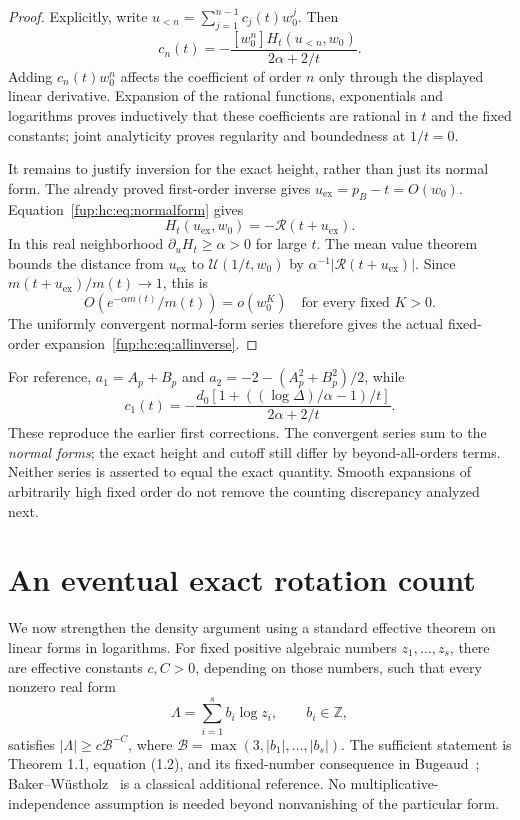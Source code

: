 \documentclass[11pt,letterpaper]{article}
\theoremstyle{definition}\newtheorem{definition}[theorem]{Definition}
\theoremstyle{remark}\newtheorem{remark}[theorem]{Remark}
\newcommand{\Z}{\mathbb Z}\newcommand{\Np}{\mathbb Z_{>0}}
\begin{document}
\begin{proof}
Explicitly, write $u_{<n}=\sum_{j=1}^{n-1}c_j(t)w_0^j$. Then
\begin{equation}\label{fup:hc:eq:inverserec}
 c_n(t)=-\frac{[w_0^n]H_t(u_{<n},w_0)}{2\alpha+2/t}.
\end{equation}
Adding $c_n(t)w_0^n$ affects the coefficient of order $n$ only through the displayed linear derivative. Expansion of the rational functions, exponentials and logarithms proves inductively that these coefficients are rational in $t$ and the fixed constants; joint analyticity proves regularity and boundedness at $1/t=0$.

It remains to justify inversion for the exact height, rather than just its normal form. The already proved first-order inverse gives $u_{\mathrm{ex}}=p_B-t=O(w_0)$. Equation~\eqref{fup:hc:eq:normalform} gives
\[
 H_t(u_{\mathrm{ex}},w_0)=-\mathcal R(t+u_{\mathrm{ex}}).
\]
In this real neighborhood $\partial_uH_t\ge\alpha>0$ for large $t$. The mean value theorem bounds the distance from $u_{\mathrm{ex}}$ to $\mathcal U(1/t,w_0)$ by $\alpha^{-1}|\mathcal R(t+u_{\mathrm{ex}})|$. Since $m(t+u_{\mathrm{ex}})/m(t)\to1$, this is
\[
 O(e^{-\alpha m(t)}/m(t))=o(w_0^K)\quad\text{for every fixed }K>0.
\]
The uniformly convergent normal-form series therefore gives the actual fixed-order expansion~\eqref{fup:hc:eq:allinverse}.
\end{proof}

For reference, $a_1=A_p+B_p$ and $a_2=-2-(A_p^2+B_p^2)/2$, while
\[
 c_1(t)=-\frac{d_0[1+((\log\Delta)/\alpha-1)/t]}{2\alpha+2/t}.
\]
These reproduce the earlier first corrections. The convergent series sum to the \emph{normal forms}; the exact height and cutoff still differ by beyond-all-orders terms. Neither series is asserted to equal the exact quantity. Smooth expansions of arbitrarily high fixed order do not remove the counting discrepancy analyzed next.


\section{An eventual exact rotation count}\label{fup:hc:sec:exact}
We now strengthen the density argument using a standard effective theorem on linear forms in logarithms. For fixed positive algebraic numbers $z_1,\ldots,z_s$, there are effective constants $c,C>0$, depending on those numbers, such that every nonzero real form
\[
 \Lambda=\sum_{i=1}^s b_i\log z_i,\qquad b_i\in\Z,
\]
satisfies $|\Lambda|\ge c\mathcal B^{-C}$, where $\mathcal B=\max(3,|b_1|,\ldots,|b_s|)$. The sufficient statement is Theorem 1.1, equation (1.2), and its fixed-number consequence in Bugeaud~\cite{fup:hc:bugeaud}; Baker--W\"ustholz~\cite{fup:hc:baker} is a classical additional reference. No multiplicative-independence assumption is needed beyond nonvanishing of the particular form.
\end{document}
